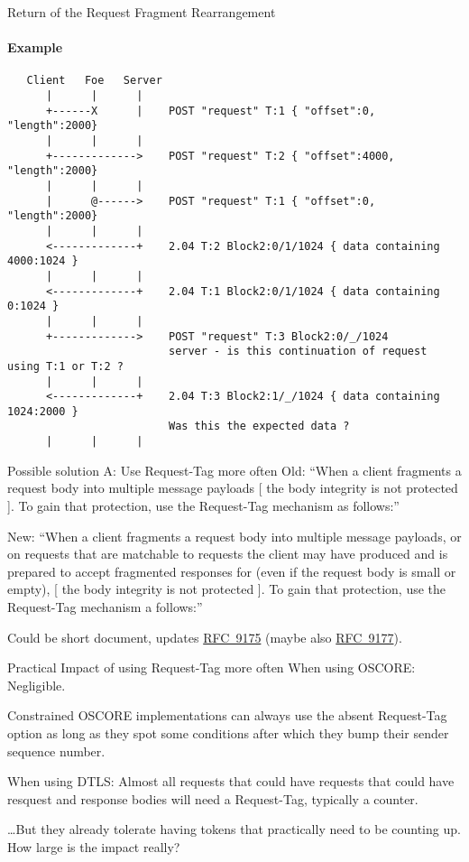 \documentclass[aspectratio=169,colorlinks]{beamer}
\newcommand{\rfc}[1]{\href{https://datatracker.ietf.org/doc/html/rfc#1}{RFC~#1}}
\begin{document}
\begin{frame}[fragile]{Return of the Request Fragment Rearrangement}\small
	\framesubtitle{Example}
	\begin{verbatim}
   Client   Foe   Server
      |      |      |
      +------X      |    POST "request" T:1 { "offset":0, "length":2000}
      |      |      |
      +------------->    POST "request" T:2 { "offset":4000, "length":2000}
      |      |      |
      |      @------>    POST "request" T:1 { "offset":0, "length":2000}
      |      |      |
      <-------------+    2.04 T:2 Block2:0/1/1024 { data containing 4000:1024 }
      |      |      |
      <-------------+    2.04 T:1 Block2:0/1/1024 { data containing 0:1024 }
      |      |      |
      +------------->    POST "request" T:3 Block2:0/_/1024
                         server - is this continuation of request using T:1 or T:2 ?
      |      |      |
      <-------------+    2.04 T:3 Block2:1/_/1024 { data containing 1024:2000 }
                         Was this the expected data ?
      |      |      |
	\end{verbatim}
\end{frame}

\begin{frame}{Possible solution A: Use Request-Tag more often}\large
	Old: ``When a client fragments a request body into multiple message payloads [ the body integrity is not protected ]. To gain that protection, use the Request-Tag mechanism as follows:''

	\bigskip

	New: ``\tiny{}When a client fragments a request body into multiple message payloads\large{}, or on requests that are matchable to requests the client may have produced and is prepared to accept fragmented responses for (even if the request body is small or empty), \tiny [ the body integrity is not protected ]. To gain that protection, use the Request-Tag mechanism a follows:''

	\large
	\bigskip

	Could be short document, updates \rfc{9175} (maybe also \rfc{9177}).
\end{frame}

\begin{frame}{Practical Impact of using Request-Tag more often}\large
	When using OSCORE: Negligible.

	Constrained OSCORE implementations can always use the absent Request-Tag option
	as long as they spot some conditions after which they bump their sender sequence number.

	\bigskip

	When using DTLS:
	Almost all requests that could have requests that could have resquest and response bodies
	will need a Request-Tag, typically a counter.

	\ldots But they already tolerate having tokens that practically need to be counting up. How large is the impact really?
\end{frame}
\end{document}
